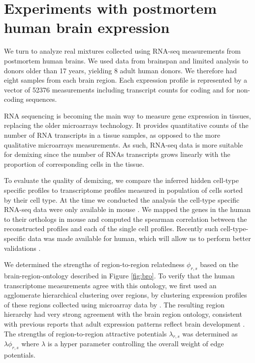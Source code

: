 \documentclass{article} %
\begin{document}
\section{Experiments with postmortem human brain expression}
\label{Human_exp}
We turn to analyze real mixtures collected using RNA-seq measurements from postmortem human brains. We used data from brainspan \cite{brainspan} %
and limited analysis to donors older than 17 years, yielding 8 adult human donors. We therefore had eight samples from each brain region. Each expression profile is represented by a vector of 52376 measurements including transcript counts for coding and for non-coding sequences.

RNA sequencing is becoming the main way to measure gene expression in tissues, replacing the older microarrays technology. It provides quantitative counts of the number of RNA transcripts in a tissue samples, as opposed to the more qualitative microarrays measurements. As such, RNA-seq data is more suitable for demixing since the number of RNAs transcripts grows linearly with the proportion of corresponding cells in the tissue.

To evaluate the quality of demixing, we compare the inferred hidden cell-type specific profiles to transcriptome profiles measured in population of cells sorted by their cell type. At the time we conducted the analysis the cell-type specific RNA-seq data were only available in mouse \cite{barres2014}. We mapped the genes in the human to their orthologs in mouse and computed the spearman correlation between the reconstructed profiles and each of the single cell profiles. Recently such cell-type-specific data was made available for human, which will allow us to perform better validations \cite{darmanis2015survey}. 

We determined the strengths of region-to-region relatedness $\phi_{r,s}$ based on the brain-region-ontology described in Figure \ref{fig:bro}. To verify that the human transcriptome measurements agree with this ontology, we first used an agglomerate hierarchical clustering over regions, by clustering expression profiles of these regions collected using microarray data by \cite{kang2011spatio}. The resulting region hierarchy had very strong agreement with the brain region ontology, consistent with previous reports that adult expression patterns reflect brain development \cite{zapala2005}. The strengths of region-to-region attractive potentials $\lambda_{r,s}$ was determined as $\lambda \phi_{r,s}$ where $\lambda$ is a hyper parameter controlling the overall weight of edge potentials. 
\end{document}
